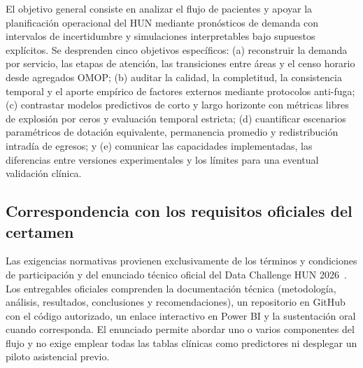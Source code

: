 El objetivo general consiste en analizar el flujo de pacientes y apoyar la planificación operacional del HUN mediante pronósticos de demanda con intervalos de incertidumbre y simulaciones interpretables bajo supuestos explícitos. Se desprenden cinco objetivos específicos: (a) reconstruir la demanda por servicio, las etapas de atención, las transiciones entre áreas y el censo horario desde agregados OMOP; (b) auditar la calidad, la completitud, la consistencia temporal y el aporte empírico de factores externos mediante protocolos anti-fuga; (c) contrastar modelos predictivos de corto y largo horizonte con métricas libres de explosión por ceros y evaluación temporal estricta; (d) cuantificar escenarios paramétricos de dotación equivalente, permanencia promedio y redistribución intradía de egresos; y (e) comunicar las capacidades implementadas, las diferencias entre versiones experimentales y los límites para una eventual validación clínica.

\subsection{Correspondencia con los requisitos oficiales del certamen}

Las exigencias normativas provienen exclusivamente de los términos y condiciones de participación y del enunciado técnico oficial del Data Challenge HUN 2026~\cite{hun2026terminos,hun2026reto}. Los entregables oficiales comprenden la documentación técnica (metodología, análisis, resultados, conclusiones y recomendaciones), un repositorio en GitHub con el código autorizado, un enlace interactivo en Power BI y la sustentación oral cuando corresponda. El enunciado permite abordar uno o varios componentes del flujo y no exige emplear todas las tablas clínicas como predictores ni desplegar un piloto asistencial previo.

